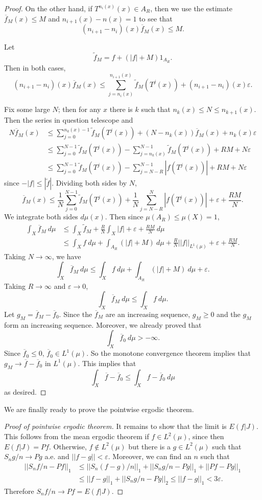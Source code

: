 \documentclass[12pt]{report}
\theoremstyle{definition}
\begin{document}
\begin{proof}
On the other hand, if $T^{n_i(x)}(x) \in A_R$, then we use the estimate $\overline f_M(x) \leq M$ and $n_{i+1}(x) - n(x) = 1$ to see that
$$(n_{i+1} - n_i)(x) \overline f_M(x) \leq M.$$

Let
$$\tilde f_M = f + (|f| + M)1_{A_R}.$$
Then in both cases,
$$(n_{i+1} - n_i)(x) \overline f_M(x) \leq \sum_{j=n_i(x)}^{n_{i+1}(x)} \tilde f_M(T^j(x)) + (n_{i+1} - n_i)(x)\varepsilon.$$

Fix some large $N$; then for any $x$ there is $k$ such that $n_k(x) \leq N \leq n_{k+1}(x)$. Then the series in question telescope and
\begin{align*}N \overline f_M(x) &\leq \sum_{j=0}^{n_k(x) - 1} \tilde f_M(T^j(x)) + (N - n_k(x))\overline f_M(x) + n_k(x)\varepsilon
\\& \leq \sum_{j=0}^{N-1} \tilde f_M(T^j(x)) - \sum_{j=n_k(x)}^{N-1} \tilde f_M(T^j(x)) + RM + N\varepsilon
\\& \leq \sum_{j=0}^{N-1} \tilde f_M(T^j(x)) - \sum_{j = N-R}^{N-1} |f(T^j(x))| + RM + N\varepsilon
\end{align*}
since $-|f| \leq |\tilde f|$. Dividing both sides by $N$,
$$\overline f_M(x) \leq \frac{1}{N} \sum_{j=0}^{N-1} \tilde f_M(T^j(x)) + \frac{1}{N} \sum_{j=N-R}^N |f(T^j(x))| + \varepsilon + \frac{RM}{N}.$$
We integrate both sides $d\mu(x)$. Then since $\mu(A_R) \leq \mu(X) = 1$,
\begin{align*}\int_X \overline f_M ~d\mu &\leq \int_X \tilde f_M + \frac{R}{N} \int_X |f| + \varepsilon + \frac{RM}{N} ~d\mu
\\ &\leq \int_X f~d\mu + \int_{A_R} (|f| + M)~d\mu + \frac{R}{N} ||f||_{L^1(\mu)} + \varepsilon + \frac{RM}{N}.
\end{align*}
Taking $N \to \infty$, we have
$$\int_X \overline f_M ~d\mu \leq \int_X f ~d\mu + \int_{A_R} (|f| + M) ~d\mu + \varepsilon.$$
Taking $R \to \infty$ and $\varepsilon \to 0$,
$$\int_X \overline f_M ~d\mu \leq \int_X f~d\mu.$$
Let $g_M = \overline f_M - \overline f_0$. Since the $\overline f_M$ are an increasing sequence, $g_M \geq 0$ and the $g_M$ form an increasing sequence. Moreover, we already proved that
$$\int_X \overline f_0 ~d\mu > -\infty.$$
Since $\overline f_0 \leq 0$, $\overline f_0 \in L^1(\mu)$. So the monotone convergence theorem implies that $g_M \to \overline f - \overline f_0$ in $L^1(\mu)$. This implies that
$$\int_X \overline f - \overline f_0 \leq \int_X f - \overline f_0 ~d\mu$$
as desired.
\end{proof}
We are finally ready to prove the pointwise ergodic theorem.
\begin{proof}[Proof of pointwise ergodic theorem]
It remains to show that the limit is $E(f|J)$. This follows from the mean ergodic theorem if $f \in L^2(\mu)$, since then $E(f|J) = Pf$. Otherwise, $f \notin L^2(\mu)$ but there is a $g \in L^2(\mu)$ such that $S_ng/n \to Pg$ a.e. and $||f - g|| < \varepsilon$. Moreover, we can find an $n$ such that
\begin{align*}||S_nf/n - Pf||_1 &\leq ||S_n(f-g)/n||_1 + ||S_ng/n - Pg||_1 + ||Pf - Pg||_1\\& \leq ||f - g||_1 + ||S_ng/n - Pg||_2 \leq ||f - g||_1 < 3\varepsilon.\end{align*}
Therefore $S_nf/n \to Pf= E(f|J)$.
\end{proof}
\end{document}
